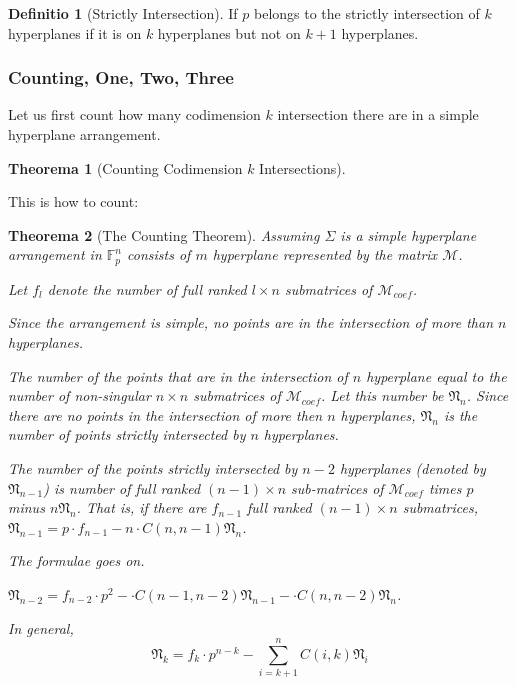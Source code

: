 \documentclass[12pt, a4paper]{article}
\newtheorem{theorem}{Theorema}[subsection]
\theoremstyle{definition}
\newtheorem{definition}{Definitio}[section]
\theoremstyle{remark}
\begin{document}
\begin{definition}[Strictly Intersection]
	If $p$ belongs to the strictly intersection of $k$ hyperplanes if it is on $k$ hyperplanes but not on $k+1$ hyperplanes.
\end{definition}

\subsubsection{Counting, One, Two, Three}
Let us first count how many codimension $k$ intersection there are in a simple hyperplane arrangement.

\begin{theorem}[Counting Codimension $k$ Intersections]
	
\end{theorem}

This is how to count:

\begin{theorem}[The Counting Theorem]
	Assuming $\Sigma$ is a simple hyperplane arrangement in $\mathbb{F}_p^n$ consists of $m$ hyperplane represented by the matrix $\mathcal{M}$. 

	Let $f_{l}$ denote the number of full ranked $l \times n
	$ submatrices of $\mathcal{M}_{coef}$.

	Since the arrangement is simple, no points are in the intersection of more than $n$ hyperplanes. 

	The number of the points that are in the intersection of $n$ hyperplane equal to the number of non-singular $n \times n$ submatrices of $\mathcal{M}_{coef}$. Let this number be $\mathfrak{N}_n$. Since there are no points in the intersection of more then $n$ hyperplanes, $\mathfrak{N}_n$ is the number of points strictly intersected by $n$ hyperplanes. 

	The number of the points strictly intersected by $n-2$ hyperplanes (denoted by $\mathfrak{N}_{n-1}$) is number of full ranked $(n-1) \times n$ sub-matrices of $\mathcal{M}_{coef}$ times $p$ minus  $n\mathfrak{N}_{n}$. That is, if there are $f_{n-1}$ full ranked $(n-1) \times n$ submatrices, $\mathfrak{N}_{n-1} = p \cdot f_{n-1} - n \cdot C(n, n-1) \mathfrak{N}_n$.

	The formulae goes on.

	$\mathfrak{N}_{n-2} = f_{n-2} \cdot p^2 -  \cdot C(n-1, n-2) \mathfrak{N}_{n-1} - \cdot C(n, n-2) \mathfrak{N}_{n}$.

	In general, 
	\begin{equation}
		\mathfrak{N}_{k} = f_{k} \cdot p^{n-k} - \sum_{i = k+1}^{n} C(i, k) \mathfrak{N}_{i}
	\end{equation}
\end{theorem}
\end{document}
